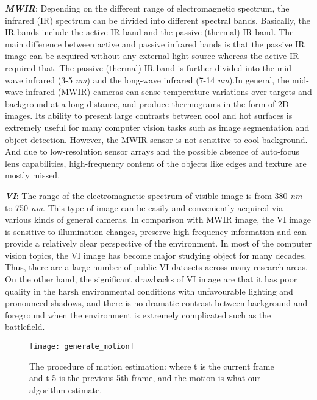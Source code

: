 \documentclass[journal]{IEEEtran}
\begin{document}
\textit{\textbf{MWIR}}: Depending on the different range of electromagnetic spectrum, the infrared (IR) spectrum can be divided into different spectral bands. Basically, the IR bands include the active IR band and the passive (thermal) IR band. The main difference between active and passive infrared bands is that the passive IR image can be acquired without any external light source whereas the active IR required that. The passive (thermal) IR band is further divided into the mid-wave infrared (3-5 \textit{um}) and the long-wave infrared (7-14 \textit{um}).In general, the mid-wave infrared (MWIR) cameras can sense temperature variations over targets and background at a long distance, and produce thermograms in the form of 2D images. Its ability to present large contrasts between cool and hot surfaces is extremely useful for many computer vision tasks such as image segmentation and object detection. However, the MWIR sensor is not sensitive to cool background. And due to low-resolution sensor arrays and the possible absence of auto-focus lens capabilities, high-frequency content of the objects like edges and texture are mostly missed.

\textit{\textbf{VI}}: The range of the electromagnetic spectrum of visible image is from 380 \textit{nm} to 750 \textit{nm}. This type of image can be easily and conveniently acquired via various kinds of general cameras. In comparison with MWIR image, the VI image is sensitive to illumination changes, preserve high-frequency information and can provide a relatively clear perspective of the environment. In most of the computer vision topics, the VI image has become major studying object for many decades. Thus, there are a large number of public VI datasets across many research areas. On the other hand, the significant drawbacks of VI image are that it has poor quality in the harsh environmental conditions with unfavourable lighting and pronounced shadows, and there is no dramatic contrast between background and foreground when the environment is extremely complicated such as the battlefield.

\begin{figure}[htbp]
\texttt{[image: generate\_motion]}
\caption{The procedure of motion estimation: where t is the current frame and t-5 is the previous 5th frame, and the motion is what our algorithm estimate. }
\centering
\label{motion}
\end{figure}
\end{document}
